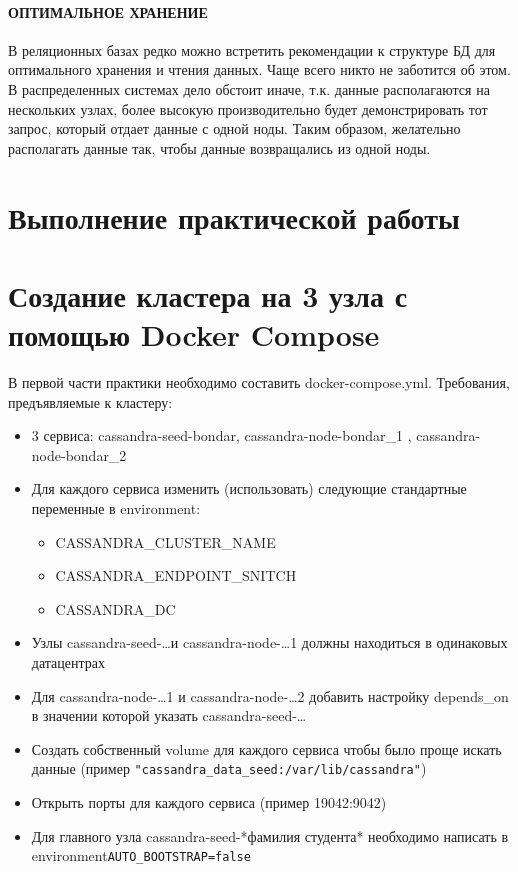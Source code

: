 \paragraph{ОПТИМАЛЬНОЕ ХРАНЕНИЕ}

В реляционных базах редко можно встретить рекомендации к структуре
БД для оптимального хранения и чтения данных. Чаще всего никто не заботится
об этом. В распределенных системах дело обстоит иначе, т.к. данные
располагаются на нескольких узлах, более высокую производительно будет
демонстрировать тот запрос, который отдает данные с одной ноды. Таким
образом, желательно располагать данные так, чтобы данные возвращались из
одной ноды.

\section*{\LARGE Выполнение практической работы}

\section{Создание кластера на 3 узла с помощью Docker Compose}

В первой части практики необходимо составить docker-compose.yml.
Требования, предъявляемые к кластеру:
\begin{itemize}
	\item 3 сервиса: cassandra-seed-bondar, cassandra-node-bondar\_1
		, cassandra-node-bondar\_2
	\item Для каждого сервиса изменить (использовать) следующие
	стандартные переменные в environment:
	\begin{itemize}
		\item CASSANDRA\_CLUSTER\_NAME
		\item CASSANDRA\_ENDPOINT\_SNITCH
		\item CASSANDRA\_DC
	\end{itemize}
	\item Узлы cassandra-seed-\ldots и cassandra-node-\ldots1 должны
		находиться в одинаковых датацентрах
	\item Для cassandra-node-\ldots1 и cassandra-node-\ldots2 добавить
		настройку depends\_on в значении которой указать cassandra-seed-\ldots
	\item Создать собственный volume для каждого сервиса чтобы было проще
		искать данные
		(пример \texttt{"cassandra\_data\_seed:/var/lib/cassandra"})
	\item Открыть порты для каждого сервиса (пример 19042:9042)
	\item Для главного узла cassandra-seed-*фамилия студента*
		необходимо написать в environment\texttt{AUTO\_BOOTSTRAP=false} 
\end{itemize}

